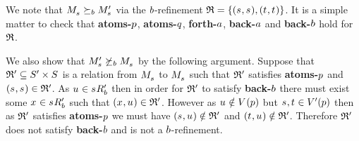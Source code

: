 \begin{example}
We note that $\kPModel{\kStateS} \simulatesB \kPModelP{\kStateS}$ via the $b$-refinement $\refinement = \{(\kStateS, \kStateS), (\kStateT, \kStateT)\}$.
It is a simple matter to check that {\bf atoms-$p$}, {\bf atoms-$q$}, {\bf forth-$a$}, {\bf back-$a$} and {\bf back-$b$} hold for $\mathfrak{R}$.

We also show that $\kPModelP{\kStateS} \not\simulatesB \kPModel{\kStateS}$ by the following argument.
Suppose that $\refinement' \subseteq \kStatesP \times \kStates$ is a relation from $\kPModel{\kStateS}$ to $\kPModel{\kStateS}$ such that $\mathfrak{R}'$ satisfies {\bf atoms-$p$} and $(\kStateS, \kStateS) \in \refinement'$.
As $\kStateU \in \kSuccessorsPB{\kStateS}$ then in order for $\mathfrak{R}'$ to satisfy {\bf back-$b$} there must exist some $\kStateX \in \kSuccessorsPB{\kStateS}$ such that $(\kStateX, \kStateU) \in \refinement'$.
However as $\kStateU \notin \kValuation(\atomP)$ but $\kStateS, \kStateT \in \kValuationP(\atomP)$ then as $\mathfrak{R}'$ satisfies {\bf atoms-$p$} we must have $(\kStateS, \kStateU) \notin \refinement'$ and $(\kStateT, \kStateU) \notin \refinement'$.
Therefore $\mathfrak{R}'$ does not satisfy {\bf back-$b$} and is not a $b$-refinement.
\end{example}

